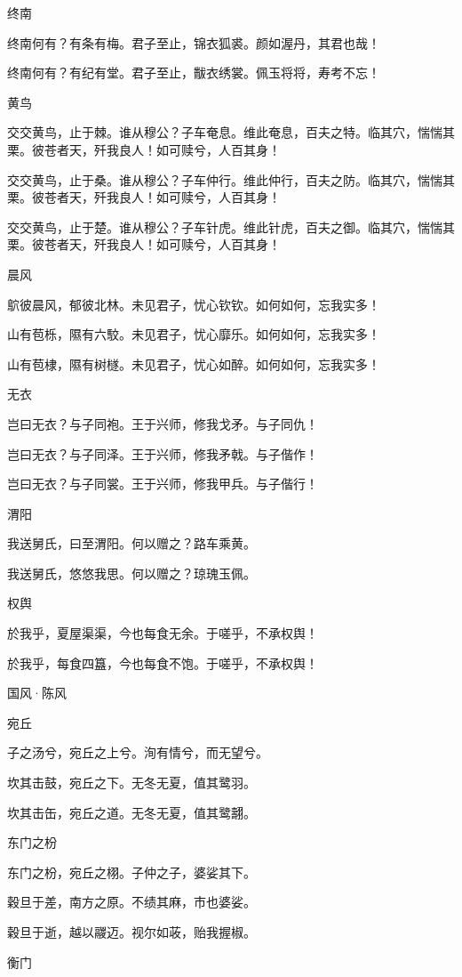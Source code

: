 终南

终南何有？有条有梅。君子至止，锦衣狐裘。颜如渥丹，其君也哉！

终南何有？有纪有堂。君子至止，黻衣绣裳。佩玉将将，寿考不忘！

黄鸟

交交黄鸟，止于棘。谁从穆公？子车奄息。维此奄息，百夫之特。临其穴，惴惴其栗。彼苍者天，歼我良人！如可赎兮，人百其身！

交交黄鸟，止于桑。谁从穆公？子车仲行。维此仲行，百夫之防。临其穴，惴惴其栗。彼苍者天，歼我良人！如可赎兮，人百其身！

交交黄鸟，止于楚。谁从穆公？子车针虎。维此针虎，百夫之御。临其穴，惴惴其栗。彼苍者天，歼我良人！如可赎兮，人百其身！

晨风

鴥彼晨风，郁彼北林。未见君子，忧心钦钦。如何如何，忘我实多！

山有苞栎，隰有六駮。未见君子，忧心靡乐。如何如何，忘我实多！

山有苞棣，隰有树檖。未见君子，忧心如醉。如何如何，忘我实多！

无衣

岂曰无衣？与子同袍。王于兴师，修我戈矛。与子同仇！

岂曰无衣？与子同泽。王于兴师，修我矛戟。与子偕作！

岂曰无衣？与子同裳。王于兴师，修我甲兵。与子偕行！

渭阳

我送舅氏，曰至渭阳。何以赠之？路车乘黄。

我送舅氏，悠悠我思。何以赠之？琼瑰玉佩。

权舆

於我乎，夏屋渠渠，今也每食无余。于嗟乎，不承权舆！

於我乎，每食四簋，今也每食不饱。于嗟乎，不承权舆！




国风·陈风


宛丘

子之汤兮，宛丘之上兮。洵有情兮，而无望兮。

坎其击鼓，宛丘之下。无冬无夏，值其鹭羽。

坎其击缶，宛丘之道。无冬无夏，值其鹭翿。

东门之枌

东门之枌，宛丘之栩。子仲之子，婆娑其下。

穀旦于差，南方之原。不绩其麻，市也婆娑。

穀旦于逝，越以鬷迈。视尔如荍，贻我握椒。

衡门

